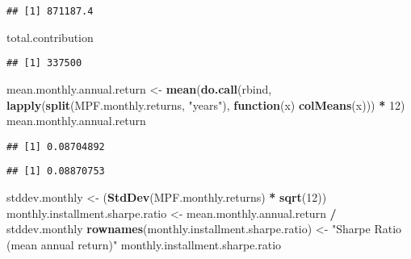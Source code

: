 \documentclass[
]{article}
\newenvironment{Shaded}{\begin{snugshade}}{\end{snugshade}}
\newcommand{\ControlFlowTok}[1]{\textcolor[rgb]{0.13,0.29,0.53}{\textbf{#1}}}
\newcommand{\DecValTok}[1]{\textcolor[rgb]{0.00,0.00,0.81}{#1}}
\newcommand{\KeywordTok}[1]{\textcolor[rgb]{0.13,0.29,0.53}{\textbf{#1}}}
\newcommand{\NormalTok}[1]{#1}
\newcommand{\OperatorTok}[1]{\textcolor[rgb]{0.81,0.36,0.00}{\textbf{#1}}}
\newcommand{\StringTok}[1]{\textcolor[rgb]{0.31,0.60,0.02}{#1}}
\begin{document}
\begin{verbatim}
## [1] 871187.4
\end{verbatim}

\begin{Shaded}
\begin{Highlighting}[]
\NormalTok{total.contribution}
\end{Highlighting}
\end{Shaded}

\begin{verbatim}
## [1] 337500
\end{verbatim}

\begin{Shaded}
\begin{Highlighting}[]
\NormalTok{mean.monthly.annual.return <-}
\StringTok{  }\KeywordTok{mean}\NormalTok{(}\KeywordTok{do.call}\NormalTok{(rbind, }\KeywordTok{lapply}\NormalTok{(}\KeywordTok{split}\NormalTok{(MPF.monthly.returns, }\StringTok{"years"}\NormalTok{), }\ControlFlowTok{function}\NormalTok{(x)}
    \KeywordTok{colMeans}\NormalTok{(x))) }\OperatorTok{*}\StringTok{ }\DecValTok{12}\NormalTok{)}
\NormalTok{mean.monthly.annual.return}
\end{Highlighting}
\end{Shaded}

\begin{verbatim}
## [1] 0.08704892
\end{verbatim}

\begin{Shaded}
\end{Shaded}

\begin{verbatim}
## [1] 0.08870753
\end{verbatim}

\begin{Shaded}
\begin{Highlighting}[]
\NormalTok{stddev.monthly <-}\StringTok{ }\NormalTok{(}\KeywordTok{StdDev}\NormalTok{(MPF.monthly.returns) }\OperatorTok{*}\StringTok{ }\KeywordTok{sqrt}\NormalTok{(}\DecValTok{12}\NormalTok{))}
\NormalTok{monthly.installment.sharpe.ratio <-}
\StringTok{  }\NormalTok{mean.monthly.annual.return }\OperatorTok{/}\StringTok{ }\NormalTok{stddev.monthly}
\KeywordTok{rownames}\NormalTok{(monthly.installment.sharpe.ratio) <-}
\StringTok{  "Sharpe Ratio (mean annual return)"}
\NormalTok{monthly.installment.sharpe.ratio}
\end{Highlighting}
\end{Shaded}
\end{document}

